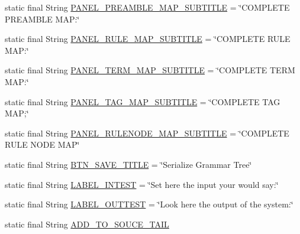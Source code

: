 \begin{DoxyCompactItemize}
\item 
static final String \hyperlink{classit_1_1emarolab_1_1cagg_1_1debugging_1_1DebuggingDefaults_a34082b789d80232b8f3fc77e3e67c6ec}{P\-A\-N\-E\-L\-\_\-\-P\-R\-E\-A\-M\-B\-L\-E\-\_\-\-M\-A\-P\-\_\-\-S\-U\-B\-T\-I\-T\-L\-E} = \char`\"{}C\-O\-M\-P\-L\-E\-T\-E P\-R\-E\-A\-M\-B\-L\-E M\-A\-P\-:\char`\"{}
\item 
static final String \hyperlink{classit_1_1emarolab_1_1cagg_1_1debugging_1_1DebuggingDefaults_aa8de8cb1e7960c283cdb7f735c9e23e1}{P\-A\-N\-E\-L\-\_\-\-R\-U\-L\-E\-\_\-\-M\-A\-P\-\_\-\-S\-U\-B\-T\-I\-T\-L\-E} = \char`\"{}C\-O\-M\-P\-L\-E\-T\-E R\-U\-L\-E M\-A\-P\-:\char`\"{}
\item 
static final String \hyperlink{classit_1_1emarolab_1_1cagg_1_1debugging_1_1DebuggingDefaults_ac9d79d6e9cd7f69c87562ece06ee1b08}{P\-A\-N\-E\-L\-\_\-\-T\-E\-R\-M\-\_\-\-M\-A\-P\-\_\-\-S\-U\-B\-T\-I\-T\-L\-E} = \char`\"{}C\-O\-M\-P\-L\-E\-T\-E T\-E\-R\-M M\-A\-P\-:\char`\"{}
\item 
static final String \hyperlink{classit_1_1emarolab_1_1cagg_1_1debugging_1_1DebuggingDefaults_a49f546d8c2f807e738228337939afa88}{P\-A\-N\-E\-L\-\_\-\-T\-A\-G\-\_\-\-M\-A\-P\-\_\-\-S\-U\-B\-T\-I\-T\-L\-E} = \char`\"{}C\-O\-M\-P\-L\-E\-T\-E T\-A\-G M\-A\-P;\char`\"{}
\item 
static final String \hyperlink{classit_1_1emarolab_1_1cagg_1_1debugging_1_1DebuggingDefaults_a527eedef90f4d452124085c001fa1aac}{P\-A\-N\-E\-L\-\_\-\-R\-U\-L\-E\-N\-O\-D\-E\-\_\-\-M\-A\-P\-\_\-\-S\-U\-B\-T\-I\-T\-L\-E} = \char`\"{}C\-O\-M\-P\-L\-E\-T\-E R\-U\-L\-E N\-O\-D\-E M\-A\-P\char`\"{}
\item 
static final String \hyperlink{classit_1_1emarolab_1_1cagg_1_1debugging_1_1DebuggingDefaults_a0464e2088444b5e75d9a7f0973598de2}{B\-T\-N\-\_\-\-S\-A\-V\-E\-\_\-\-T\-I\-T\-L\-E} = \char`\"{}Serialize Grammar Tree\char`\"{}
\item 
static final String \hyperlink{classit_1_1emarolab_1_1cagg_1_1debugging_1_1DebuggingDefaults_aebaf478f1c0a8b248f6f914c513aa5b1}{L\-A\-B\-E\-L\-\_\-\-I\-N\-T\-E\-S\-T} = \char`\"{}Set here the input your would say\-:\char`\"{}
\item 
static final String \hyperlink{classit_1_1emarolab_1_1cagg_1_1debugging_1_1DebuggingDefaults_adefd4db05f3d950b413f9f0abadc33f1}{L\-A\-B\-E\-L\-\_\-\-O\-U\-T\-T\-E\-S\-T} = \char`\"{}Look here the output of the system\-:\char`\"{}
\item 
static final String \hyperlink{classit_1_1emarolab_1_1cagg_1_1debugging_1_1DebuggingDefaults_a8b72418ad1f0e3a3f075fe3c6f754baa}{A\-D\-D\-\_\-\-T\-O\-\_\-\-S\-O\-U\-C\-E\-\_\-\-T\-A\-I\-L}

\end{DoxyCompactItemize}

